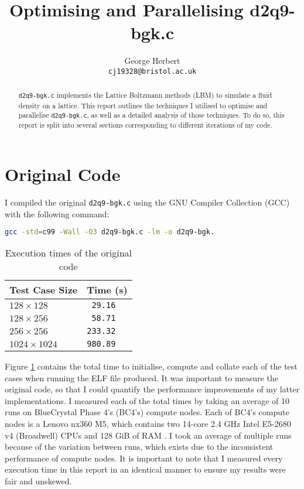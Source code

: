 \documentclass[11pt, twocolumn, a4paper]{article}
\author{
    George Herbert\\
    \texttt{cj19328@bristol.ac.uk}
}
\title{Optimising and Parallelising d2q9-bgk.c}
\begin{document}
\maketitle

\begin{abstract}
    \texttt{d2q9-bgk.c} implements the Lattice Boltzmann methods (LBM) to simulate a fluid density on a lattice.
    This report outlines the techniques I utilised to optimise and parallelise \texttt{d2q9-bgk.c}, as well as a detailed analysis of those techniques.
    To do so, this report is split into several sections corresponding to different iterations of my code.
\end{abstract}

\section{Original Code}

I compiled the original \texttt{d2q9-bgk.c} using the GNU Compiler Collection (GCC) with the following command:
\begin{lstlisting}[language=bash, breaklines=true, breakatwhitespace=true]
gcc -std=c99 -Wall -O3 d2q9-bgk.c -lm -o d2q9-bgk.
\end{lstlisting}

\begin{table}[htbp]
    \begin{center}
    \caption{Execution times of the original code}\label{tab:original}
    \begin{tabular}{l | l} 
        \hline\hline
        Test Case Size&Time (s)\\
        \hline
        $128 \times 128$&\texttt{ 29.16}\\
        $128 \times 256$&\texttt{ 58.71}\\
        $256 \times 256$&\texttt{233.32}\\
        $1024 \times 1024$&\texttt{980.89}\\
        \hline
      \end{tabular}
    \end{center}
\end{table} 

Figure \ref{tab:original} contains the total time to initialise, compute and collate each of the test cases when running the ELF file produced.
It was important to measure the original code, so that I could quantify the performance improvements of my latter implementations.
I measured each of the total times by taking an average of 10 runs on BlueCrystal Phase 4's (BC4's) compute nodes.
Each of BC4's compute nodes is a Lenovo nx360 M5, which contains two 14-core 2.4 GHz Intel E5-2680 v4 (Broadwell) CPUs and 128 GiB of RAM \cite{bcp4}.
I took an average of multiple runs because of the variation between runs, which exists due to the inconsistent performance of compute nodes.
It is important to note that I measured every execution time in this report in an identical manner to ensure my results were fair and unskewed.
\end{document}
